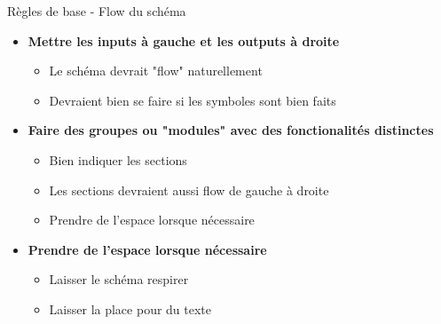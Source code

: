 \begin{frame}{Règles de base - Flow du schéma}
    \begin{itemize}
        \item \textbf{Mettre les inputs à gauche et les outputs à droite}
        \begin{itemize}
            \item Le schéma devrait "flow" naturellement
            \item Devraient bien se faire si les symboles sont bien faits
        \end{itemize}
        \bigskip
        \item \textbf{Faire des groupes ou "modules" avec des fonctionalités distinctes}
        \begin{itemize}
            \item Bien indiquer les sections
            \item Les sections devraient aussi flow de gauche à droite
            \item Prendre de l'espace lorsque nécessaire
        \end{itemize}
        \bigskip
        \item \textbf{Prendre de l'espace lorsque nécessaire}
        \begin{itemize}
            \item Laisser le schéma respirer
            \item Laisser la place pour du texte
        \end{itemize}
    \end{itemize}
\end{frame}

